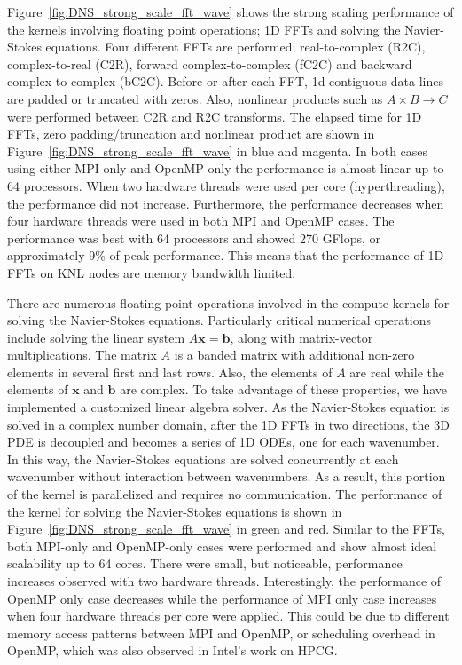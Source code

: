 Figure~\ref{fig:DNS_strong_scale_fft_wave} shows the strong scaling performance
of the kernels involving floating point operations; 1D FFTs and solving the
Navier-Stokes equations. Four different FFTs are performed; real-to-complex
(R2C), complex-to-real (C2R), forward complex-to-complex (fC2C) and backward
complex-to-complex (bC2C). Before or after each FFT, 1d contiguous data lines
are padded or truncated with zeros.  Also, nonlinear products such as $A\times
B \rightarrow C$ were performed between C2R and R2C transforms. The elapsed
time for 1D FFTs, zero padding/truncation and nonlinear product are shown in
Figure~\ref{fig:DNS_strong_scale_fft_wave} in blue and magenta. In both cases
using either MPI-only and OpenMP-only the performance is almost linear up to 64
processors. When two hardware threads were used per core (hyperthreading), the
performance did not increase. Furthermore, the performance decreases when four
hardware threads were used in both MPI and OpenMP cases. The performance was
best with 64 processors and showed 270 GFlops, or approximately 9\% of peak
performance. This means that the performance of 1D FFTs on KNL nodes are memory
bandwidth limited.

There are numerous floating point operations involved in the compute
kernels for solving the Navier-Stokes equations. 
Particularly critical numerical operations include solving the linear system  
$A \textbf{x} = \textbf{b}$, along with 
matrix-vector multiplications. The matrix $A$ is a banded matrix with
additional non-zero elements in several first and last rows. Also, the
elements of $A$ are real while the elements of $\textbf{x}$ and
$\textbf{b}$ are complex. To take advantage of these properties, we have
implemented a customized linear algebra solver. As the Navier-Stokes
equation is solved in a complex number domain, after the 1D FFTs in two
directions, the 3D PDE is decoupled and becomes a series of 1D ODEs, one
for each wavenumber. In this way, the
Navier-Stokes equations are solved concurrently at each wavenumber without
interaction between wavenumbers. As a result, this portion of the kernel
is parallelized and requires no communication. The performance of
the kernel for solving the Navier-Stokes equations is shown in
Figure~\ref{fig:DNS_strong_scale_fft_wave} in green and red. Similar to
the FFTs, both MPI-only and OpenMP-only cases were performed and show
almost ideal scalability up to 64 cores.
There were small, but noticeable, performance increases
observed with two hardware threads. Interestingly, the performance of
OpenMP only case decreases while the performance of MPI only case
increases when four hardware threads per core were applied. This could be
due to different memory access patterns between MPI and OpenMP,
or scheduling overhead in OpenMP, which was also observed in Intel's work on
HPCG\cite{Park:2014:ESI:2683593.2683696}.

